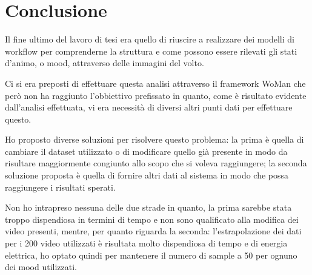 \chapter*{Conclusione}

Il fine ultimo del lavoro di tesi era quello di riuscire a realizzare dei modelli di 
workflow per comprenderne la struttura e come possono essere rilevati gli stati 
d’animo, o mood, attraverso delle immagini del volto. 

Ci si era preposti di effettuare questa 
analisi attraverso il framework WoMan che però non ha raggiunto l’obbiettivo 
prefissato in quanto, come è risultato evidente dall’analisi effettuata, vi era necessità di 
diversi altri punti dati per effettuare questo. 

Ho proposto diverse soluzioni per 
risolvere questo problema: la prima è quella di cambiare il dataset utilizzato o di 
modificare quello già presente in modo da risultare maggiormente congiunto allo 
scopo che si voleva raggiungere; la seconda soluzione proposta è quella di fornire 
altri dati al sistema in modo che possa raggiungere i risultati sperati. 

Non ho 
intrapreso nessuna delle due strade in quanto, la prima sarebbe stata troppo dispendiosa in termini di tempo e non sono qualificato alla modifica dei video presenti, mentre, per quanto riguarda la seconda: l’estrapolazione dei dati per i 200 video utilizzati 
è risultata molto dispendiosa di tempo e di energia elettrica, ho optato quindi per mantenere il 
numero di sample a 50 per ognuno dei mood utilizzati. 

